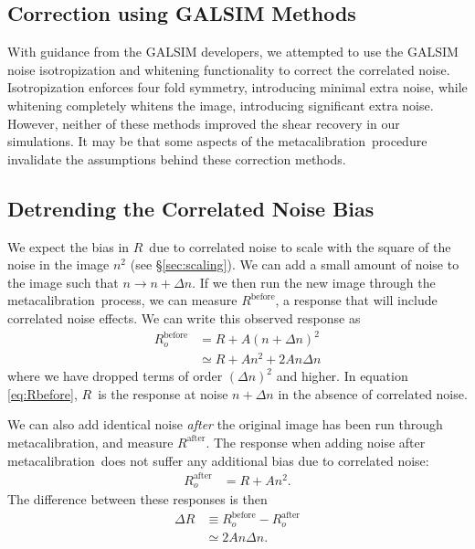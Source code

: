 \documentclass[usegraphicx,usenatbib]{mn2e}
\newcommand{\mcal}{metacalibration}
\newcommand{\mcalR}{$R$}
\begin{document}
\subsection{Correction using GALSIM Methods}

With guidance from the GALSIM developers, we attempted to use the GALSIM noise
isotropization and whitening functionality to correct the correlated noise.
Isotropization enforces four fold symmetry, introducing minimal extra noise,
while whitening completely whitens the image, introducing significant extra
noise.  However, neither of these methods improved the shear recovery in our
simulations.  It may be that some aspects of the \mcal\ procedure invalidate
the assumptions behind these correction methods.


\subsection{Detrending the Correlated Noise Bias} \label{sec:detrend}

We expect the bias in \mcalR\ due to correlated noise to scale with the square
of the noise in the image $n^2$ (see \S \ref{sec:scaling}).  We can add a small
amount of noise to the image such that $n \rightarrow n + \Delta n$.  If we
then run the new image through the \mcal\ process, we can measure
$R^{\mathrm{before}}$, a response that will include correlated noise effects.
We can write this observed response as
\begin{align}\label{eq:Rbefore}
    R_o^{\mathrm{before}} &= R + A (n + \Delta n)^2 \nonumber \\
       &\simeq R + A n^2 + 2 A n \Delta n
\end{align}
where we have dropped terms of order $(\Delta n)^2$ and higher.  In equation
\ref{eq:Rbefore}, \mcalR\ is the response at noise $n+\Delta n$ in the absence
of correlated noise.  

We can also add identical noise {\em after} the original image  has been run
through \mcal, and measure $R^{\mathrm{after}}$.  The response when adding
noise after \mcal\ does not suffer any additional bias due to correlated noise:
\begin{align}
    R_o^{\mathrm{after}} &= R + A n^2.
\end{align}
The difference between these responses is then 
\begin{align}
    \Delta R &\equiv R_o^{\mathrm{before}} - R_o^{\mathrm{after}}  \nonumber \\
             &\simeq 2 A n \Delta n.
\end{align}
\end{document}
